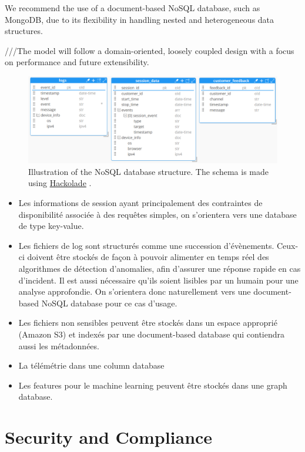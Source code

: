 \documentclass[11pt,a4paper,computermodern]{article}
\begin{document}
We recommend the use of a document-based NoSQL database, such as MongoDB, due to its flexibility in handling nested and heterogeneous data structures.

///The model will follow a domain-oriented, loosely coupled design with a focus on performance and future extensibility.

\begin{figure}
	\centering
	\includegraphics[scale=0.66]{./figures/NoSQL}
	\caption{Illustration of the NoSQL database structure. The schema is made using \href{https://hackolade.com/}{Hackolade} .}
	\label{fig:NoSQL}
\end{figure}


\begin{itemize}
	\item Les informations de session ayant principalement des contraintes de disponibilité associée à des requêtes simples, on s'orientera vers une database de type key-value.
	\item Les fichiers de log sont structurés comme une succession d'évènements. Ceux-ci doivent être stockés de façon à pouvoir alimenter en temps réel des algorithmes de détection d'anomalies, afin d'assurer une réponse rapide en cas d'incident. Il est aussi nécessaire qu'ils soient lisibles par un humain pour une analyse approfondie. On s'orientera donc naturellement vers une document-based NoSQL database pour ce cas d'usage.
	\item Les fichiers non sensibles peuvent être stockés dans un espace approprié (Amazon S3) et indexés par une document-based database qui contiendra aussi les métadonnées.
	\item La télémétrie dans une column database
	\item Les features pour le machine learning peuvent être stockés dans une graph database.
\end{itemize}


\section*{Security and Compliance}
\end{document}
